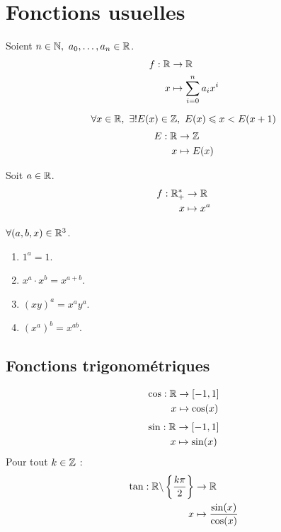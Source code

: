\chapter{Fonctions usuelles}


\begin{definition}
	Soient $n \in \mathbb{N},\ a_0, \ldots, a_n \in \mathbb{R}$.
	\begin{align*}
		f : \mathbb{R} &\to \mathbb{R} \\
            x &\mapsto \sum_{i = 0}^{n} a_i x^i
	\end{align*}
\end{definition}

\begin{definition}
	\[ \forall x \in \mathbb{R},\ \exists ! E(x) \in \mathbb{Z},\ E(x) \leqslant x < E(x + 1) \]
	\begin{align*}
		E : \mathbb{R} &\to \mathbb{Z} \\
        x &\mapsto E(x)
	\end{align*}
\end{definition}

\begin{definition}
	Soit $a \in \mathbb{R}$.
	\begin{align*}
		f : \mathbb{R}_+^* &\to \mathbb{R} \\
        x &\mapsto x^a
	\end{align*}
\end{definition}

\begin{proposition}
	$\forall (a, b, x) \in \mathbb{R}^3$.
    \begin{multicols}{4}
        \begin{enumerate}
            \item $1^a = 1$.
            \item $x^a \cdot x^b = x^{a + b}$.
            \item $(xy)^a = x^a y^a$.
            \item $(x^a)^b = x^{ab}$.
        \end{enumerate}
    \end{multicols}
\end{proposition}

\section{Fonctions trigonométriques}
\begin{definition}
	\begin{align*}
		\cos : \mathbb{R} &\to [-1, 1] \\
		        x &\mapsto \cos(x)
	\end{align*}
	\begin{align*}
		\sin : \mathbb{R} &\to [-1, 1] \\
		        x &\mapsto \sin(x)
	\end{align*}
	Pour tout $k \in \mathbb{Z}$ :
	\begin{align*}
		\tan : \mathbb{R} \backslash \left\{ \frac{k \pi}{2} \right\} &\to \mathbb{R} \\
		                                   					x &\mapsto \frac{\sin(x)}{\cos(x)}
	\end{align*}
\end{definition}

